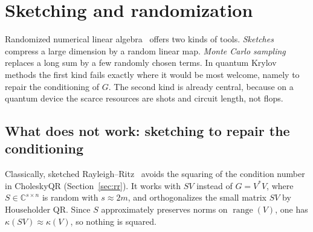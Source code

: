 \documentclass[11pt,a4paper]{article}
\newcommand{\C}{\mathbb{C}}
\begin{document}
\section{Sketching and randomization}\label{sec:sketch}

Randomized numerical linear algebra~\cite{MT20} offers two kinds of
tools. \emph{Sketches} compress a large dimension by a random linear
map. \emph{Monte Carlo sampling} replaces a long sum by a few randomly
chosen terms. In quantum Krylov methods the first kind fails exactly
where it would be most welcome, namely to repair the conditioning of
$G$. The second kind is already central, because on a quantum device the
scarce resources are shots and circuit length, not flops.

\subsection{What does not work: sketching to repair the conditioning}

Classically, sketched Rayleigh--Ritz~\cite{NT24} avoids the squaring of
the condition number in Cholesky\-QR (Section~\ref{sec:rr}). It works
with $SV$ instead of $G=V^*V$, where $S\in\C^{s\times n}$ is random with
$s\approx2m$, and orthogonalizes the small matrix $SV$ by Householder QR.
Since $S$ approximately preserves norms on $\operatorname{range}(V)$, one
has $\kappa(SV)\approx\kappa(V)$, so nothing is squared.
\end{document}
